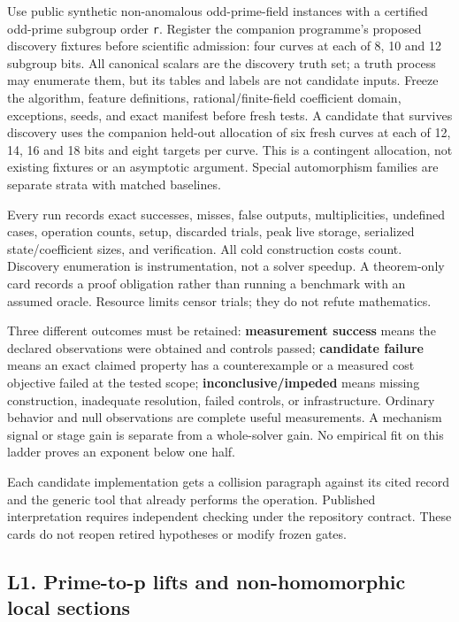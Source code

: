 \documentclass[
  10pt,
]{article}
\begin{document}
Use public synthetic non-anomalous odd-prime-field instances with a
certified odd-prime subgroup order \texttt{r}. Register the companion
programme's proposed discovery fixtures before scientific admission:
four curves at each of 8, 10 and 12 subgroup bits. All canonical scalars
are the discovery truth set; a truth process may enumerate them, but its
tables and labels are not candidate inputs. Freeze the algorithm,
feature definitions, rational/finite-field coefficient domain,
exceptions, seeds, and exact manifest before fresh tests. A candidate
that survives discovery uses the companion held-out allocation of six
fresh curves at each of 12, 14, 16 and 18 bits and eight targets per
curve. This is a contingent allocation, not existing fixtures or an
asymptotic argument. Special automorphism families are separate strata
with matched baselines.

Every run records exact successes, misses, false outputs,
multiplicities, undefined cases, operation counts, setup, discarded
trials, peak live storage, serialized state/coefficient sizes, and
verification. All cold construction costs count. Discovery enumeration
is instrumentation, not a solver speedup. A theorem-only card records a
proof obligation rather than running a benchmark with an assumed oracle.
Resource limits censor trials; they do not refute mathematics.

Three different outcomes must be retained: \textbf{measurement success}
means the declared observations were obtained and controls passed;
\textbf{candidate failure} means an exact claimed property has a
counterexample or a measured cost objective failed at the tested scope;
\textbf{inconclusive/impeded} means missing construction, inadequate
resolution, failed controls, or infrastructure. Ordinary behavior and
null observations are complete useful measurements. A mechanism signal
or stage gain is separate from a whole-solver gain. No empirical fit on
this ladder proves an exponent below one half.

Each candidate implementation gets a collision paragraph against its
cited record and the generic tool that already performs the operation.
Published interpretation requires independent checking under the
repository contract. These cards do not reopen retired hypotheses or
modify frozen gates.

\subsection{L1. Prime-to-p lifts and non-homomorphic local
sections}\label{l1.-prime-to-p-lifts-and-non-homomorphic-local-sections}
\end{document}
